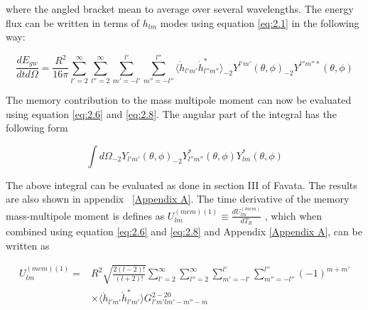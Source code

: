 \documentclass[prd,preprintnumbers,twocolumn,eqsecnum,floatfix,letter]{revtex4}
\begin{document}
where the angled bracket mean to average over several wavelengths. The energy flux can be written in terms of $h_{lm}$ modes using equation \ref{eq:2.1} in the following way:
\begin{widetext}
\begin{equation}\label{eq:2.8}
		\frac{dE_{gw}}{dtd\Omega}=\frac{R^2}{16\pi}\sum_{l'=2}^{\infty}\sum_{l''=2}^{\infty}\sum_{m'=-l'}^{l'}\sum_{m''=-l''}^{l''}\langle\dot{h}_{l'm'}\dot{h}^*_{l''m''}\rangle _{-2}Y^{l'm'}(\theta,\phi)_{-2}Y^{l''m''*}(\theta, \phi)
\end{equation}
\end{widetext}

The memory contribution to the mass multipole moment can now be evaluated using equation \ref{eq:2.6} and \ref{eq:2.8}. The angular part of the integral has the following form

\begin{equation}\label{eq:2.9}
	\int d\Omega _{-2}Y_{l'm'}(\theta,\phi)_{-2}Y_{l''m''}^{*}(\theta, \phi)Y_{lm}^{*}(\theta, \phi)
\end{equation}

The above integral can be evaluated as done in section III of  Favata\cite{Favata2009}. The results are also shown in appendix ~\ref{Appendix A}. The time derivative of the memory mass-multipole moment is defines as $U^{(mem)(1)}_{lm}\equiv\frac{dU^{(mem)}_{lm}}{dT_R}$ \cite{Favata2009}, which when combined using equation \ref{eq:2.6} and \ref{eq:2.8} and Appendix \ref{Appendix A}, can be written as

\begin{align}\label{eq:2.10}
	U_{lm}^{(mem)(1)}=&R^{2}\sqrt{\frac{2(l-2)!}{(l+2)!}}\sum_{l'=2}^{\infty}\sum_{l''=2}^{\infty}\sum_{m'=-l'}^{l'}\sum_{m''=-l''}^{l''}(-1)^{m+m'}\nonumber\\
	&\times\Bigg\langle \dot{h}_{l'm'}\dot{h}_{l'm'}^{*}\Bigg\rangle G^{2-20}_{l'm'lm'-m''-m}
\end{align}
 
\end{document}

